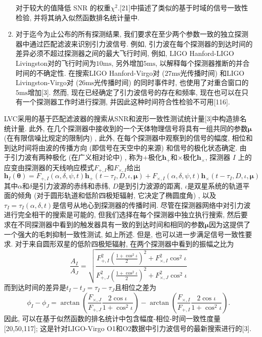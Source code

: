\documentclass[a4paper]{\documentclassname}
\def\b{\boldsymbol}
\def\t{\text}
\theoremstyle{definition}
\begin{document}
\begin{enumerate}
\begin{equation}
    \end{equation}
    对于较大的值降低 SNR 的权重$\chi^2$.[21]中描述了类似的基于时域的信号一致性检验, 并将其纳入似然函数排名统计量中. 
    \item 对于迄今为止公布的所有探测结果, 我们要求在至少两个参数一致的独立探测器中通过匹配滤波来识别引力波信号. 例如, 引力波在每个探测器的到达时间的差异必须不超过探测器之间的最大飞行时间, 例如, LIGO Hanford-LIGO Livingston对的飞行时间为$10 \t{ms}$, 另外增加$5 \t{ms}$, 以解释每个探测器推断的并合时间的不确定性. 在搜索LIGO Hanford-Virgo对 ($27 \t{ms}$光传播时间) 和LIGO Livingston-Virgo对 ($26 \t{ms}$光传播时间) 的同时事件时, 也使用了对重合窗口的$5 \t{ms}$增加[3]. 然而, 现在已经确定了引力波信号的存在和频率, 现在也可以在只有一个探测器工作时进行探测, 并因此这种时间符合性检验不可用[116]. 
\end{enumerate}

LVC采用的基于匹配滤波器的搜索从SNR和波形一致性测试统计量[3]中构造排名统计量. 此外, 在几个探测器中接收到的一个天体物理信号将具有一组共同的参数$\b{\mu}$ (在有限信噪比规定的限制内) , 此外, 在每个探测器中观察到的信号的幅度, 相位和到达时间将由波的传播方向 (即信号在天空中的来源) 和信号的极化状态确定. 由于引力波有两种极化 (在广义相对论中) , 称为$+$极化$\b{h}_+$和$\times$极化$\b{h}_\times$, 探测器 $I$ 上的应变由探测器的天线响应模式$ F_{+,I} $和$F_{\times,I}$给出
\begin{equation}
    \b{h}_I(\b{\theta})=F_{+,I}(\alpha,\delta,\psi,t)\b{h}_+(t-\tau_I,D,\iota,\b{\mu})+F_{\times,I}(\alpha,\delta,\psi,t)\b{h}_\times(t-\tau_I,D,\iota,\b{\mu})
\end{equation}
其中$\alpha$和$\delta$是引力波源的赤纬和赤纬, $D$是到引力波源的距离, $\iota$是双星系统的轨道平面的倾角 (对于圆形轨道和低阶四极矩辐射, 它决定了椭圆度角) , 以及$\tau_I=\tau_I (\alpha, \delta, t) $是信号从地心到探测器的传播时间. 尽管在探测器网络中对引力波进行完全相干的搜索是可能的, 但我们选择在每个探测器中独立执行搜索, 然后要求在不同探测器中看到的触发器具有一致的到达时间和相同的参数${\b{\mu}}$因为这提供了一个强大的毛刺抑制一致性测试, 如上所述. 但是, 也可以进一步满足信号一致性要求. 对于来自圆形双星的低阶四极矩辐射, 在两个探测器中看到的振幅之比为
\begin{equation}
    \frac{A_I}{A_J}=\sqrt{
        \frac{
            F_{+,I}^2\left(\frac{1+\cos^2\iota}{2}\right)^2+F_{\times,I}^2\cos^2\iota
        }{
            F_{+,J}^2\left(\frac{1+\cos^2\iota}{2}\right)^2+F_{\times,J}^2\cos^2\iota
        }
    }
\end{equation}
而到达时间的差异是$t_I - t_J = \tau_I - \tau_J$且相位之差为
\begin{equation}
    \phi_I - \phi_J = \arctan\left(\frac{F_{\times,J}}{F_{+,J}}\frac{2\cos\iota}{1+\cos^2\iota}\right)-\arctan\left(\frac{F_{\times,I}}{F_{+,I}}\frac{2\cos\iota}{1+\cos^2\iota}\right).
\end{equation}
因此, 可以在基于似然函数的排名统计中包含幅度-相位-时间一致性度量[20,50,117]; 这是针对LIGO-Virgo O1和O2数据中引力波信号的最新搜索进行的[3]. 
\end{document}
